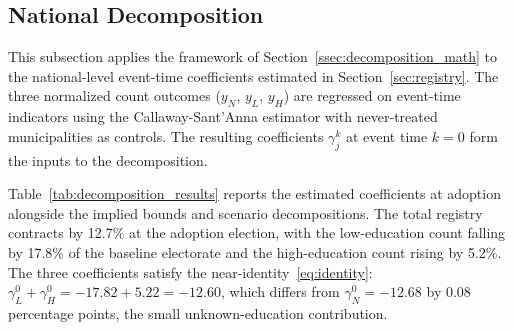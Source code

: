 \subsection{National Decomposition}
\label{ssec:decomposition_national}

This subsection applies the framework of Section~\ref{ssec:decomposition_math} to the national-level event-time coefficients estimated in Section~\ref{sec:registry}. The three normalized count outcomes ($y_N$, $y_L$, $y_H$) are regressed on event-time indicators using the Callaway-Sant'Anna estimator with never-treated municipalities as controls. The resulting coefficients $\gamma_j^k$ at event time $k = 0$ form the inputs to the decomposition.

Table~\ref{tab:decomposition_results} reports the estimated coefficients at adoption alongside the implied bounds and scenario decompositions. The total registry contracts by 12.7\% at the adoption election, with the low-education count falling by 17.8\% of the baseline electorate and the high-education count rising by 5.2\%. The three coefficients satisfy the near-identity~\eqref{eq:identity}: $\gamma_L^0 + \gamma_H^0 = -17.82 + 5.22 = -12.60$, which differs from $\gamma_N^0 = -12.68$ by 0.08 percentage points, the small unknown-education contribution.

